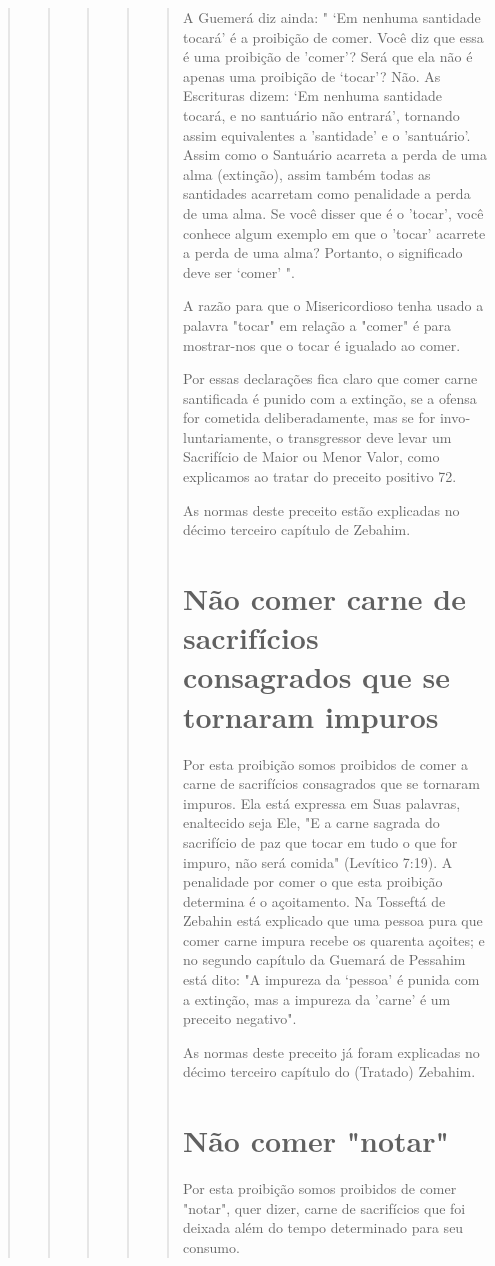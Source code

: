 \begin{quote}
\begin{quote}
\begin{quote}
\begin{quote}
\begin{quote}
A Guemerá diz ainda: " `Em nenhuma santidade tocará' é a proibi­ção de
comer. Você diz que essa é uma proibição de 'comer'? Será que ela não é
apenas uma proibição de `tocar'? Não. As Escrituras dizem: `Em nenhuma
san­tidade tocará, e no santuário não entrará', tornando assim
equivalentes a 'santi­dade' e o 'santuário'. Assim como o Santuário
acarreta a perda de uma alma (extinção), assim também todas as
santidades acarretam como penalidade a perda de uma alma. Se você disser
que é o 'tocar', você conhece algum exemplo em que o 'tocar' acarrete a
perda de uma alma? Portanto, o significado deve ser `comer' ".

A razão para que o Misericordioso tenha usado a palavra "tocar" em
relação a "comer" é para mostrar-nos que o tocar é igualado ao comer.

Por essas declarações fica claro que comer carne santificada é puni­do
com a extinção, se a ofensa for cometida deliberadamente, mas se for
invo­luntariamente, o transgressor deve levar um Sacrifício de Maior ou
Menor Va­lor, como explicamos ao tratar do preceito positivo 72.

As normas deste preceito estão explicadas no décimo terceiro capí­tulo
de Zebahim.

\section{Não comer carne de sacrifícios consagrados que se tornaram impuros}

Por esta proibição somos proibidos de comer a carne de sacrifícios
consagrados que se tornaram impuros. Ela está expressa em Suas palavras,
enal­tecido seja Ele, "E a carne sagrada do sacrifício de paz que tocar
em tudo o que for impuro, não será comida" (Levítico 7:19). A penalidade
por comer o que esta proibição determina é o açoitamento. Na Tosseftá de
Zebahin está ex­plicado que uma pessoa pura que comer carne impura
recebe os quarenta açoites; 
e no segundo capítulo da Guemará de Pessahim está dito: "A impureza
da `pessoa' é punida com a extinção, mas a impureza da 'carne' é um
preceito negativo".

As normas deste preceito já foram explicadas no décimo terceiro
ca­pítulo do (Tratado) Zebahim.

\section{Não comer "notar"}

Por esta proibição somos proibidos de comer "notar", quer dizer, carne
de sacrifícios que foi deixada além do tempo determinado para seu
consumo.


\end{quote}
\end{quote}
\end{quote}
\end{quote}
\end{quote}
